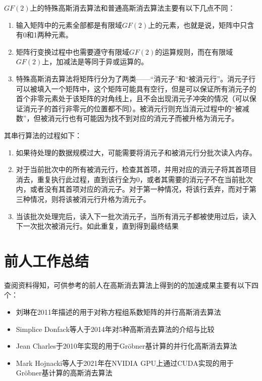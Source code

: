 \documentclass[a4paper]{article}
\begin{document}
$GF(2)$上的特殊高斯消去算法和普通高斯消去算法主要有以下几点不同：

\begin{enumerate}
  \item 输入矩阵中的元素全部都是有限域$GF(2)$上的元素，也就是说，矩阵中只含有0和1两种元素。
  \item 矩阵行变换过程中也需要遵守有限域$GF(2)$的运算规则，而在有限域$GF(2)$上，加减法是等同于异或运算的。
  \item 特殊高斯消去算法将矩阵行分为了两类——“消元子”和“被消元行”。消元子行可以被填入一个矩阵中，这个矩阵可能具有空行，但是可以保证所有消元子的首个非零元素处于该矩阵的对角线上，且不会出现消元子冲突的情况（可以保证消元子的首行非零元的位置都不同）。被消元行则充当消元过程中的“被减数”，但被消元行也有可能因为找不到对应的消元子而被升格为消元子。
\end{enumerate}

其串行算法的过程如下：

\begin{enumerate}
    \item 如果待处理的数据规模过大，可能需要将消元子和被消元行分批次读入内存。
    \item 对于当前批次中的所有被消元行，检查其首项，并用对应的消元子将其首项目消去，重复执行此过程，直到该行全为0，或者其需要的消元子不在当前批次内，或者没有其首项对应的消元子。对于第一种情况，将该行丢弃，而对于第三种情况，则将该被消元行升格为消元子。
    \item 当该批次处理完后，读入下一批次消元子，当所有消元子都被使用过后，读入下一次批次被消元行。如此重复，直到得到最终结果
\end{enumerate}



\section{前人工作总结}

查阅资料得知，可供参考的前人在高斯消去算法上得到的的加速成果主要有以下四个：

\begin{itemize}
    \item 刘琳在2011年描述的用于对称方程组系数矩阵的并行高斯消去算法\cite{lin_liu_song_2011}
    \item Simplice Donfack等人于2014年对5种高斯消去算法的介绍与比较\cite{donfack2015survey}
    \item Jean Charles于2010年实现的用于Gröbner基计算的并行化高斯消去算法\cite{faugere2010parallel}
    \item Mark Hojnacki等人于2021年在NVIDIA GPU上通过CUDA实现的用于Gröbner基计算的高斯消去算法\cite{hojnacki2021parallel}
\end{itemize}
\end{document}

